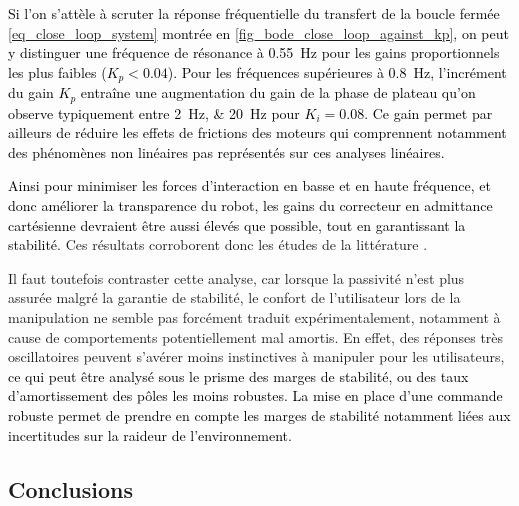 

\textcolor{black}{Si l'on s'attèle à scruter la réponse fréquentielle du transfert de la boucle fermée \cref{eq_close_loop_system} montrée en \cref{fig_bode_close_loop_against_kp}, on peut y distinguer une fréquence de résonance à \SI{0.55}{\hertz} pour les gains proportionnels les plus faibles ($K_p<0.04$). Pour les fréquences supérieures à \SI{0.8}{\hertz}, l'incrément du gain $K_p$ entraîne une augmentation du gain de la phase de plateau qu'on observe typiquement entre \SIlist{2;20}{\hertz} pour $K_i=0.08$. Ce gain permet par ailleurs de réduire les effets de frictions des moteurs qui comprennent notamment des phénomènes non linéaires \parencite{lamy_conception_2011} pas représentés sur ces analyses linéaires.}

%

\textcolor{black}{Ainsi pour minimiser les forces d'interaction en basse et en haute fréquence, et donc améliorer la transparence du robot, les gains du correcteur en admittance cartésienne devraient être aussi élevés que possible, tout en garantissant la stabilité.} 
Ces résultats corroborent donc les études de la littérature \parencite{newman_stability_1992,lamy_achieving_2009}. %

Il faut toutefois contraster cette analyse, car lorsque la passivité n'est plus assurée malgré la garantie de stabilité, le confort de l'utilisateur lors de la manipulation ne semble pas forcément traduit expérimentalement, notamment à cause de comportements potentiellement mal amortis. En effet, des réponses très oscillatoires peuvent s'avérer moins instinctives à manipuler pour les utilisateurs, \textcolor{black}{ce qui peut être analysé sous le prisme des marges de stabilité, ou des taux d'amortissement des pôles les moins robustes. La mise en place d'une commande robuste \parencite{buerger_relaxing_2006} permet de prendre en compte les marges de stabilité notamment liées aux incertitudes sur la raideur de l'environnement.}

\subsection{Conclusions}

